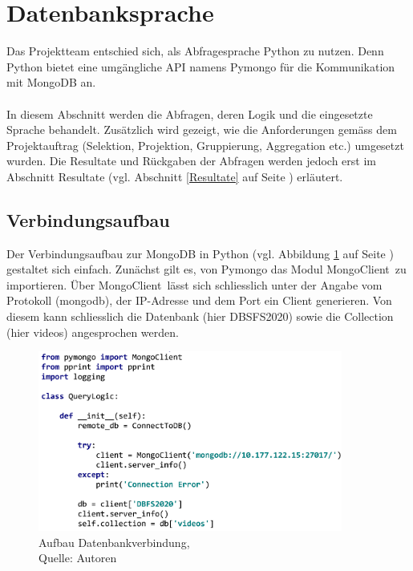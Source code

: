 \documentclass[12pt,titlepage]{article}
\begin{document}
\section{Datenbanksprache}
Das Projektteam entschied sich, als Abfragesprache Python zu nutzen. Denn Python bietet eine umgängliche API namens Pymongo für die Kommunikation mit MongoDB an.\\
\\
In diesem Abschnitt werden die Abfragen, deren Logik und die eingesetzte Sprache behandelt. Zusätzlich wird gezeigt, wie die Anforderungen gemäss dem Projektauftrag (Selektion, Projektion, Gruppierung, Aggregation etc.) umgesetzt wurden. Die Resultate und Rückgaben der Abfragen werden jedoch erst im Abschnitt Resultate (vgl. Abschnitt \ref{Resultate} auf Seite \pageref{Resultate}) erläutert.

\subsection{Verbindungsaufbau}
Der Verbindungsaufbau zur MongoDB in Python (vgl. Abbildung \ref{fig:Verbindung} auf Seite \pageref{fig:Verbindung}) gestaltet sich einfach. Zunächst gilt es, von Pymongo das Modul \glqq MongoClient\grqq\, zu importieren. Über \glqq MongoClient\grqq\, lässt sich schliesslich unter der Angabe vom Protokoll (mongodb), der IP-Adresse und dem Port ein Client generieren. Von diesem kann schliesslich die Datenbank (hier \glqq DBSFS2020\grqq) sowie die Collection (hier \glqq videos\grqq) angesprochen werden. 
\begin{figure}[h]
\centering
\includegraphics[width=10cm]{IMG/Connect.PNG}
\caption[Aufbau Datenbankverbindung]{Aufbau Datenbankverbindung,\\ Quelle: Autoren} \label{fig:Verbindung}
\end{figure}
\end{document}
